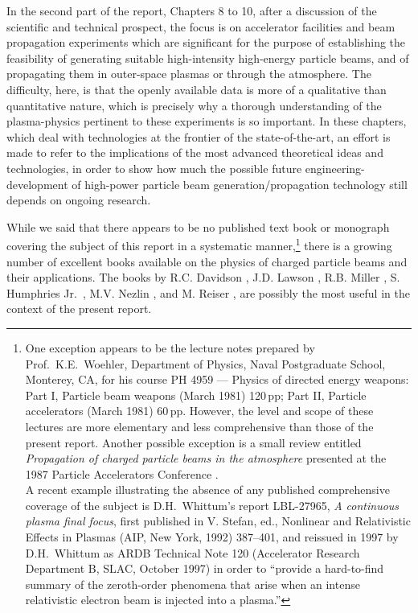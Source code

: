\documentclass [12pt,a4paper,     ]{report} %
\begin{document}
In the second part of the report, Chapters 8 to 10, after a discussion of the scientific and technical prospect, the focus is on accelerator facilities and beam propagation experiments which are significant for the purpose of establishing the feasibility of generating  suitable high-intensity high-energy particle beams, and of propagating them in outer-space plasmas or through the atmosphere.  The difficulty, here, is that the openly available data is more of a qualitative than quantitative nature, which is precisely why a thorough understanding of the plasma-physics pertinent to these experiments is so important.  In these chapters, which deal with technologies at the frontier of the state-of-the-art, an effort is made to refer to the implications of the most advanced theoretical ideas and technologies, in order to show how much the possible future engineering-development of high-power particle beam generation/propagation technology still depends on ongoing research.


While we said that there appears to be no published text book or monograph covering the subject of this report in a systematic manner,\footnote{One exception appears to be the lecture notes prepared by Prof.\ K.E.\ Woehler, Department of Physics, Naval Postgraduate School, Monterey, CA, for his course PH 4959 --- Physics of directed energy weapons: Part I, Particle beam weapons (March 1981) 120\,pp; Part II, Particle accelerators (March 1981) 60\,pp. However, the level and scope of these lectures are more elementary and less comprehensive than those of the present report.  Another possible exception is a small review entitled \emph{Propagation of charged particle beams in the atmosphere} presented at the 1987 Particle Accelerators Conference \cite{LAMPE1987-}.\smallskip \\  A recent example illustrating the absence of any published comprehensive coverage of the subject is D.H.\ Whittum's report LBL-27965, \emph{A continuous plasma final focus}, first published in V. Stefan, ed., Nonlinear and Relativistic Effects in Plasmas (AIP, New York, 1992) 387--401, and reissued in 1997 by D.H.\ Whittum as ARDB Technical Note 120 (Accelerator Research Department B, SLAC, October 1997) in order to ``provide a hard-to-find summary of the zeroth-order phenomena that arise when an intense relativistic electron beam is injected into a plasma.''} there is a growing number of excellent books available on the physics of charged particle beams and their applications.  The books by R.C. Davidson \cite{DAVID1974-}, J.D. Lawson \cite{LAWSO1977-}, R.B. Miller \cite{MILLE1982-},  S. Humphries Jr.\ \cite{HUMPH1986-, HUMPH1990-}, M.V. Nezlin \cite{NEZLI1993-}, and M. Reiser \cite{REISE1994-}, are possibly the most useful in the context of the present report.
\end{document}
